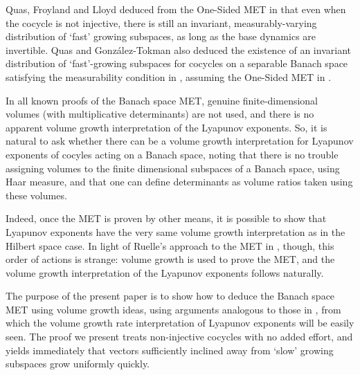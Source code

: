 \documentclass[11pt]{amsart}
\theoremstyle{theorem}
\theoremstyle{definition}
\numberwithin{equation}{section}
\begin{document}
Quas, Froyland and Lloyd \cite{QLF} deduced from the One-Sided MET in \cite{T} that even when the cocycle is not injective, there is still an invariant, measurably-varying distribution of `fast' growing subspaces, as long as the base dynamics are invertible. Quas and Gonz{\'a}lez-Tokman \cite{QT} also deduced the existence of an invariant distribution of `fast'-growing subspaces for cocycles on a separable Banach space satisfying the measurability condition in \cite{LL}, assuming the One-Sided MET in \cite{Doan}.

In all known proofs of the Banach space MET, genuine finite-dimensional volumes (with multiplicative determinants) are not used, and there is no apparent volume growth interpretation of the Lyapunov exponents. So, it is natural to ask whether there can be a volume growth interpretation for Lyapunov exponents of cocyles acting on a Banach space, noting that there is no trouble assigning volumes to the finite dimensional subspaces of a Banach space, using Haar measure, and that one can define determinants as volume ratios taken using these volumes. 



Indeed, once the MET is proven by other means, it is possible to show that Lyapunov exponents have the very same volume growth interpretation as in the Hilbert space case. In light of Ruelle's approach to the MET in \cite{R1, R2}, though, this order of actions is  strange: volume growth is used to prove the MET, and the volume growth interpretation of the Lyapunov exponents follows naturally.

The purpose of the present paper is to show how to deduce the Banach space MET using volume growth ideas, using arguments analogous to those in \cite{R2}, from which the volume growth rate interpretation of Lyapunov exponents will be easily seen. The proof we present treats non-injective cocycles with no added effort, and yields immediately that vectors sufficiently inclined away from `slow' growing subspaces grow uniformly quickly.

\medskip
\end{document}
